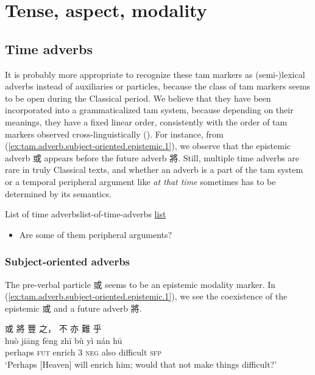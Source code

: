 \documentclass[UTF8, a4paper, oneside, scheme=plain, 12pt]{ctexrep}
\newcommand{\form}[1]{\emph{#1}}
\newcommand{\translate}[1]{`#1'}
\newcommand*{\category}[1]{\textsc{#1}}
\begin{document}
\chapter{Tense, aspect, modality}

\section{Time adverbs}\label{sec:tam.adverbs}

It is probably more appropriate to recognize these \ac{tam} markers as (semi-)lexical adverbs instead of auxiliaries or particles,
because the class of \ac{tam} markers seems to be open during the Classical period.
We believe that they have been incorporated into a grammaticalized \ac{tam} system,
because depending on their meanings, they have a fixed linear order,
consistently with the order of \ac{tam} markers observed cross-linguistically 
().
For instance, from (\ref{ex:tam.adverb.subject-oriented.epistemic.1}),
we observe that the epistemic adverb 或 appears before the future adverb 將.
Still, multiple time adverbs are rare in truly Classical texts,
and whether an adverb is a part of the \ac{tam} system or a temporal peripheral argument like \form{at that time} sometimes has to be determined by its semantics.


\begin{todobox}{List of time adverbs}{list-of-time-adverbs}
    \href{http://www.ziyexing.com/files-5/guhanyu/guhanyu_3_3.htm}{list}

    \begin{itemize}
        \item Are some of them peripheral arguments?
    \end{itemize}
\end{todobox}

\subsection{Subject-oriented adverbs}

The pre-verbal particle 或 seems to be an epistemic modality marker.
In (\ref{ex:tam.adverb.subject-oriented.epistemic.1}),
we see the coexistence of the epistemic 或 and a future adverb 將.

\begin{exe}
    \ex\label{ex:tam.adverb.subject-oriented.epistemic.1}
    \glll 或 將 豐 之， 不 亦 難 乎 \\
    huò jiāng fēng zhī bù yì nán hū \\
    perhaps \category{fut} enrich 3 \category{neg} also difficult \category{sfp} \\
    \glt\translate{Perhaps [Heaven] will enrich him; would that not make things difficult?}
\end{exe}
\end{document}
